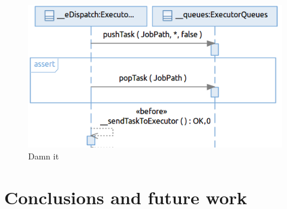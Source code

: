 \documentclass[letter]{llncs}
\begin{document}
% 
% 
% 
% 
% 



\begin{figure}[!t]
\centering

\includegraphics[width=0.5\linewidth,keepaspectratio=true]{./SDProperty.png}

\caption{Damn it}
\label{fig:Last}
\end{figure}

\section{Conclusions and future work}
\label{sec:Conclusions}

 

\end{document}
